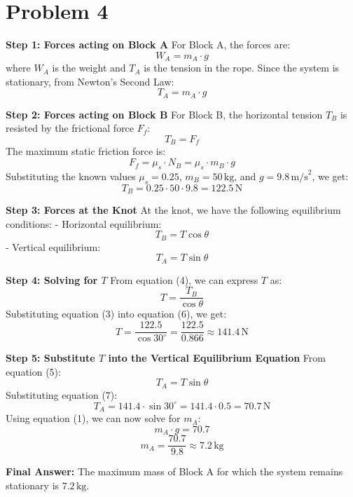 \section{Problem 4}

\textbf{Step 1: Forces acting on Block A}
For Block A, the forces are:
\[
W_A = m_A \cdot g
\]
where \( W_A \) is the weight and \( T_A \) is the tension in the rope. Since the system is stationary, from Newton's Second Law:
\[
T_A = m_A \cdot g \tag{1}
\]

\textbf{Step 2: Forces acting on Block B}
For Block B, the horizontal tension \( T_B \) is resisted by the frictional force \( F_f \):
\[
T_B = F_f
\]
The maximum static friction force is:
\[
F_f = \mu_s \cdot N_B = \mu_s \cdot m_B \cdot g \tag{2}
\]
Substituting the known values \( \mu_s = 0.25 \), \( m_B = 50 \, \text{kg} \), and \( g = 9.8 \, \text{m/s}^2 \), we get:
\[
T_B = 0.25 \cdot 50 \cdot 9.8 = 122.5 \, \text{N} \tag{3}
\]

\textbf{Step 3: Forces at the Knot}
At the knot, we have the following equilibrium conditions:
- Horizontal equilibrium: 
  \[
  T_B = T \cos \theta \tag{4}
  \]
- Vertical equilibrium:
  \[
  T_A = T \sin \theta \tag{5}
  \]
  
\textbf{Step 4: Solving for \( T \)}
From equation (4), we can express \( T \) as:
\[
T = \frac{T_B}{\cos \theta} \tag{6}
\]
Substituting equation (3) into equation (6), we get:
\[
T = \frac{122.5}{\cos 30^\circ} = \frac{122.5}{0.866} \approx 141.4 \, \text{N} \tag{7}
\]

\textbf{Step 5: Substitute \( T \) into the Vertical Equilibrium Equation}
From equation (5):
\[
T_A = T \sin \theta
\]
Substituting equation (7):
\[
T_A = 141.4 \cdot \sin 30^\circ = 141.4 \cdot 0.5 = 70.7 \, \text{N} \tag{8}
\]
Using equation (1), we can now solve for \( m_A \):
\[
m_A \cdot g = 70.7
\]
\[
m_A = \frac{70.7}{9.8} \approx 7.2 \, \text{kg} \tag{9}
\]

\textbf{Final Answer:}
The maximum mass of Block A for which the system remains stationary is \( \boxed{7.2 \, \text{kg}} \).
